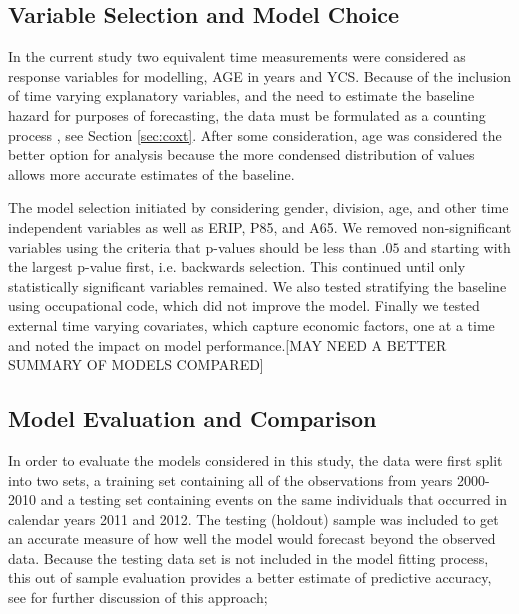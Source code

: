 \documentclass[12pt,letterpaper]{article}
\begin{document}
\subsection{Variable Selection and Model Choice} \label{sec:modelchoice}
In the current study two equivalent time measurements were considered as response variables for modelling, AGE in years and YCS.  Because of the inclusion of time varying explanatory variables, and the need to estimate the baseline hazard for purposes of forecasting, the data must be formulated as a counting process , see Section \ref{sec:coxt}.  After some consideration, age was considered the better option for analysis because the more condensed distribution of values allows more accurate estimates of the baseline.

The model selection initiated by considering gender, division, age, and other time independent variables as well as ERIP, P85, and A65. We removed non-significant variables using the criteria that p-values should be less than $.05$ and starting with the largest p-value first, i.e. backwards selection.  This continued until only statistically significant variables remained.  We also tested stratifying the baseline using occupational code, which did not improve the model. Finally we tested external time varying covariates, which capture economic factors, one at a time and noted the impact on model performance.[MAY NEED A BETTER SUMMARY OF MODELS COMPARED]


\subsection{Model Evaluation and Comparison}

In order to evaluate the models considered in this study, the data were first split into two sets, a training set containing all of the observations from years 2000-2010 and a testing set containing events on the same individuals that occurred in calendar years 2011 and 2012. The testing (holdout) sample was included to get an accurate measure of how well the model would forecast beyond the observed data.  Because the testing data set is not included in the model fitting process, this out of sample evaluation provides a better estimate of predictive accuracy, see \citet{kuhn2013} for further discussion of this approach;
\end{document}
